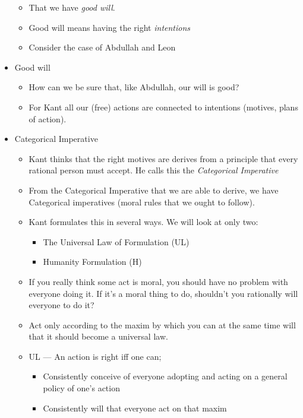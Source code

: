 \documentclass{article}
\begin{document}
\begin{spacing}{1.2}
\begin{itemize}
              \begin{itemize}
                  \item That we have \emph{good will}.
                  \item Good will means having the right \emph{intentions}
                  \item Consider the case of Abdullah and Leon
              \end{itemize}
        \item Good will
              \begin{itemize}
                  \item How can we be sure that, like Abdullah, our will is good?
                  \item For Kant all our (free) actions are connected to intentions (motives, plans of action).
              \end{itemize}
        \item Categorical Imperative
              \begin{itemize}
                  \item Kant thinks that the right motives are derives from a principle that every rational person must accept. He calls this the \emph{Categorical Imperative}
                  \item From the Categorical Imperative that we are able to derive, we have Categorical imperatives (moral rules that we ought to follow).
                  \item Kant formulates this in several ways. We will look at only two:
                        \begin{itemize}
                            \item The Universal Law of Formulation (UL)
                            \item Humanity Formulation (H)
                        \end{itemize}
                  \item If you really think some act is moral, you should have no problem with everyone doing it. If it's a moral thing to do, shouldn't you rationally will everyone to do it?
                  \item Act only according to the maxim by which you can at the same time will that it should become a universal law.
                  \item UL --- An action is right iff one can;
                        \begin{itemize}
                            \item Consistently conceive of everyone adopting and acting on a general policy of one's action
                            \item Consistently will that everyone act on that maxim
                        \end{itemize}
              \end{itemize}
    \end{itemize}
\end{spacing}
\end{document}
